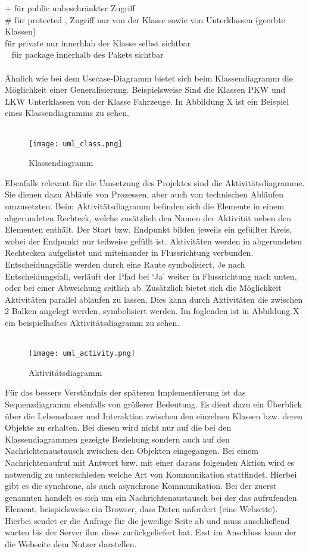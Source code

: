      + für public   unbeschränkter Zugriff\\
     \# für protected  , Zugriff nur von der Klasse sowie von Unterklassen (geerbte Klassen)\\
     \- für private  nur innerhlab der Klasse selbst sichtbar\\
     ~ für package  innerhalb des Pakets sichtbar\\
\\
Ähnlich wie bei dem Usecase-Diagramm bietet sich beim Klassendiagramm die Möglichkeit einer Generalisierung. Beispielsweise Sind die Klassen PKW und LKW Unterklassen von der Klasse Fahrzeuge. In Abbildung X ist ein Beispiel eines Klassendiagramms zu sehen.\\
\\
\begin{figure}[H]
\centering
\texttt{[image: uml\_class.png]}
\caption{Klassendiagramm}
\label{fig:show_s1_s2_p1_n1}
\end{figure}
Ebenfalls relevant für die Umsetzung des Projektes sind die Aktivitätsdiagramme. Sie dienen dazu Abläufe von Prozessen, aber auch von technischen Abläufen umzusetzten.
Beim Aktivitätsdiagramm befinden sich die Elemente in einem abgerundeten Rechteck, welche zusätzlich den Namen der Aktivität neben den Elementen enthält. Der Start bzw. Endpunkt bilden jeweils ein gefüllter Kreis, wobei der Endpunkt nur teilweise gefüllt ist. Aktivitäten werden in abgerundeten Rechtecken aufgelistet und miteinander in Flussrichtung verbunden. Entscheidungsfälle werden durch eine Raute symbolisiert. Je nach Entscheidungsfall, verläuft der Pfad bei ‘Ja’ weiter in Flussrichtung nach unten, oder bei einer Abweichung seitlich ab. Zusätzlich bietet sich die Möglichkeit Aktivitäten parallel ablaufen zu lassen. Dies kann durch Aktivitäten die zwischen 2 Balken angelegt werden, symbolisiert werden. Im foglenden ist in Abbildung X ein beispielhaftes Aktivitätsdiagramm zu sehen.\\
\\
\begin{figure}[H]
\centering
\texttt{[image: uml\_activity.png]}
\caption{Aktivitätsdiagramm}
\label{fig:show_s1_s2_p1_n1}
\end{figure}
Für das bessere Verständnis der späteren Implementierung ist das Sequenzdiagramm ebenfalls von größerer Bedeutung. Es dient dazu ein Überblick über die Lebensdauer und Interaktion zwischen den einzelnen Klassen bzw. deren Objekte zu erhalten. Bei diesen wird nicht nur auf die bei den Klassendiagrammen gezeigte Beziehung sondern auch auf den Nachrichtenaustausch zwischen den Objekten eingegangen. Bei einem Nachrichtenaufruf mit Antwort bzw. mit einer daraus folgenden Aktion wird es notwendig zu unterschieden welche Art von Kommunikation stattfindet. Hierbei gibt es die synchrone, als auch asynchrone Kommunikation. Bei der zuerst genannten handelt es sich um ein Nachrichtenaustausch bei der das aufrufenden Element, beispielsweise ein Browser, dass Daten anfordert (eine Webseite). Hierbei sendet er die Anfrage für die jeweilige Seite ab und muss anschließend warten bis der Server ihm diese zurückgeliefert hat. Erst im Anschluss kann der die Webseite dem Nutzer darstellen.
